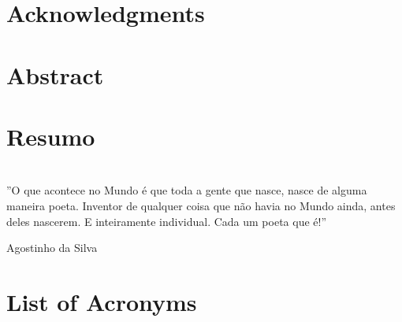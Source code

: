 \documentclass[a4paper, 11pt]{book}
\theoremstyle{definition}
\begin{document}
\frontmatter

\newpage\thispagestyle{empty}

\pagestyle{plain}



\chapter*{Acknowledgments}


\chapter*{Abstract}


\chapter*{Resumo}


\chapter*{}
\setlength\epigraphwidth{12cm}
\setlength\epigraphrule{0pt}
\makeatletter
{}
\makeatother
\vspace*{\fill}
\epigraph{''O que acontece no Mundo é que toda a gente que nasce, nasce de alguma maneira poeta. Inventor de qualquer coisa que não havia no Mundo ainda, antes deles nascerem. E inteiramente individual. Cada um poeta que é!''}
{Agostinho da Silva}
\vspace*{\fill}

\pagestyle{plain}
\tableofcontents

\chapter*{List of Acronyms}


\listoffigures

\listoftables

\mainmatter%
\end{document}

